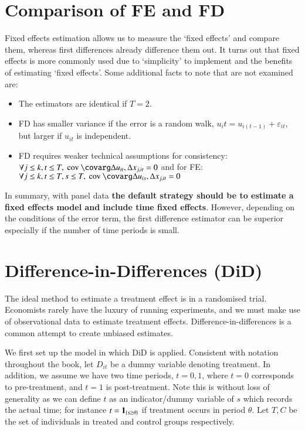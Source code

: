 		\section{Comparison of FE and FD}
			Fixed effects estimation allows us to measure the `fixed effects' and compare them, whereas first differences already difference them out. It turns out that fixed effects is more commonly used due to `simplicity' to implement and the benefits of estimating `fixed effects'. Some additional facts to note that are not examined are:
			\begin{itemize}
				\item The estimators are identical if $T=2$.
				\item FD has smaller variance if the error is a random walk, $u_it = u_{i(t-1)} + \varepsilon_{it}$, but larger if $u_{it}$ is independent.
				\item FD requires weaker technical assumptions for consistency: $\forall j\leq k,t\leq T,  \ \cov{\Delta u_{it},\Delta x_{j,it}} = 0$ and for FE: $\forall j\leq k,t\leq T,s\leq T,  \ \cov{\Delta u_{is},\Delta x_{j,it}}=0$
			\end{itemize}
			In summary, with panel data \textbf{the default strategy should be to estimate a fixed effects model and include time fixed effects}. However, depending on the conditions of the error term, the first difference estimator can be superior especially if the number of time periods is small.
			
    \section{Difference-in-Differences (DiD)}
        The ideal method to estimate a treatment effect is in a randomised trial. Economists rarely have the luxury of running experiments, and we must make use of observational data to estimate treatment effects. Difference-in-differences is a common attempt to create unbiased estimates.
        
        We first set up the model in which DiD is applied. Consistent with notation throughout the book, let $D_{it}$ be a dummy variable denoting treatment. In addition, we assume we have two time periods, $t= 0,1$, where $t=0$ corresponds to pre-treatment, and $t=1$ is post-treatment. Note this is without loss of generality as we can define $t$ as an indicator/dummy variable of $s$ which records the actual time; for instance $t = \ind_{s\geq\theta}$ if treatment occurs in period $\theta$. Let $T,C$ be the set of individuals in treated and control groups respectively.


